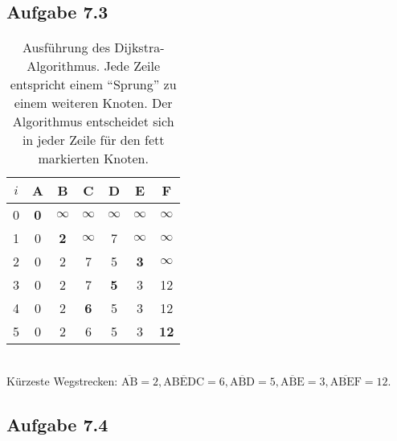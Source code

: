 \documentclass{article}
\begin{document}
    \subsection*{Aufgabe 7.3}
    \begin{table*}[h]
        \centering
        \begin{tabular}{c|cccccc}
            $i$ & A & B & C & D & E & F \\ \hline
            0   & \textbf{0} & $\infty$ & $\infty$ & $\infty$ & $\infty$ & $\infty$ \\
            1   & 0 & \textbf{2} & $\infty$ & 7 & $\infty$ & $\infty$ \\
            2   & 0 & 2 & 7 & 5 & \textbf{3} & $\infty$ \\
            3   & 0 & 2 & 7 & \textbf{5} & 3 & 12 \\
            4   & 0 & 2 & \textbf{6} & 5 & 3 & 12 \\
            5   & 0 & 2 & 6 & 5 & 3 & \textbf{12} \\
        \end{tabular}
        \caption{Ausführung des Dijkstra-Algorithmus. Jede Zeile entspricht einem "`Sprung"' zu einem weiteren Knoten. Der Algorithmus entscheidet sich in jeder Zeile für den fett markierten Knoten.}
    \end{table*}\hfill\\
    Kürzeste Wegstrecken: $\overline{\text{AB}} = 2, \overline{\text{ABEDC}} = 6, \overline{\text{ABD}} = 5, \overline{\text{ABE}} = 3, \overline{\text{ABEF}} = 12$.


    \subsection*{Aufgabe 7.4}
\end{document}
